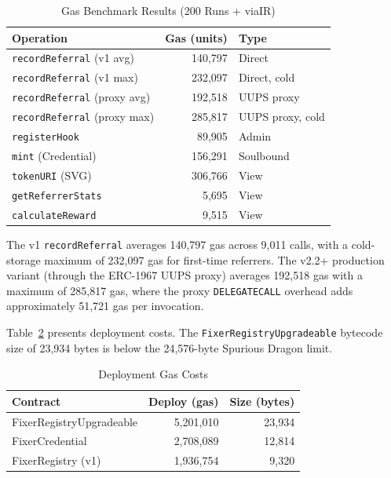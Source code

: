\documentclass[conference]{IEEEtran}
\begin{document}
\begin{table}[t]
\caption{Gas Benchmark Results (200 Runs + viaIR)}
\label{tab:gas}
\centering
\footnotesize
\begin{tabular}{lrl}
\toprule
\textbf{Operation} & \textbf{Gas (units)} & \textbf{Type} \\
\midrule
\texttt{recordReferral} (v1 avg) & 140,797 & Direct \\
\texttt{recordReferral} (v1 max) & 232,097 & Direct, cold \\
\texttt{recordReferral} (proxy avg) & 192,518 & UUPS proxy \\
\texttt{recordReferral} (proxy max) & 285,817 & UUPS proxy, cold \\
\texttt{registerHook} & 89,905 & Admin \\
\texttt{mint} (Credential) & 156,291 & Soulbound \\
\texttt{tokenURI} (SVG) & 306,766 & View \\
\texttt{getReferrerStats} & 5,695 & View \\
\texttt{calculateReward} & 9,515 & View \\
\bottomrule
\end{tabular}
\end{table}

The v1 \texttt{recordReferral} averages 140,797 gas across 9,011 calls, with a cold-storage maximum of 232,097 gas for first-time referrers. The v2.2+ production variant (through the ERC-1967 UUPS proxy) averages 192,518 gas with a maximum of 285,817 gas, where the proxy \texttt{DELEGATECALL} overhead adds approximately 51,721 gas per invocation.

Table~\ref{tab:deploy} presents deployment costs. The \texttt{Fixer\-Registry\-Upgradeable} bytecode size of 23,934 bytes is below the 24,576-byte Spurious Dragon limit.

\begin{table}[t]
\caption{Deployment Gas Costs}
\label{tab:deploy}
\centering
\begin{tabular}{lrr}
\toprule
\textbf{Contract} & \textbf{Deploy (gas)} & \textbf{Size (bytes)} \\
\midrule
FixerRegistryUpgradeable & 5,201,010 & 23,934 \\
FixerCredential & 2,708,089 & 12,814 \\
FixerRegistry (v1) & 1,936,754 & 9,320 \\
\bottomrule
\end{tabular}
\end{table}
\end{document}
